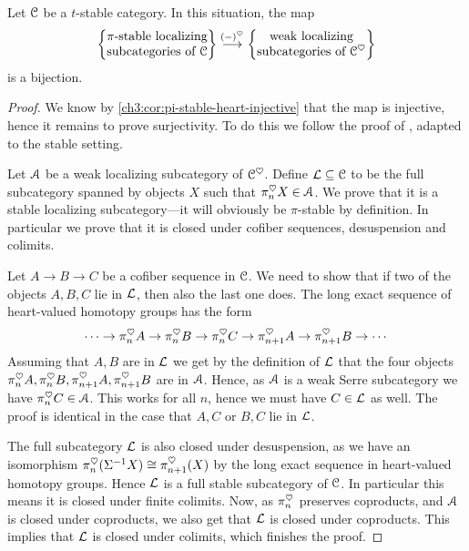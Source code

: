 \begin{theorem}
    \label{ch3:thm:premain}
    Let $\EuScript{C}$ be a $t$-stable category. In this situation, the map 
    \[\left\{ \begin{matrix} \pi\text{-stable localizing}\\ \text{subcategories of }\EuScript{C} \end{matrix} \right\}\overset{(-)^\heartsuit}{\longrightarrow} \left\{ \begin{matrix} \text{weak localizing}\\ \text{subcategories of }\EuScript{C}^\heartsuit \end{matrix} \right\}\] 
    is a bijection. 
\end{theorem}
\begin{proof}
    We know by \cref{ch3:cor:pi-stable-heart-injective} that the map is injective, hence it remains to prove surjectivity. To do this we follow the proof of \cite[C.5.2.7]{lurie_SAG}, adapted to the stable setting. 
    
    Let $\EuScript{A}$ be a weak localizing subcategory of $\EuScript{C}^\heartsuit$. Define $\mathcal{L}\subseteq \EuScript{C}$ to be the full subcategory spanned by objects $X$ such that $\pi_n^\heartsuit X\in \EuScript{A}$. We prove that it is a stable localizing subcategory---it will obviously be $\pi$-stable by definition. In particular we prove that it is closed under cofiber sequences, desuspension and colimits. 

    Let $A\rightarrow B\rightarrow C$ be a cofiber sequence in $\EuScript{C}$. We need to show that if two of the objects $A, B, C$ lie in $\mathcal{L}$, then also the last one does. The long exact sequence of heart-valued homotopy groups has the form 
    \[\cdots\rightarrow \pi^{\heartsuit}_{n}A \rightarrow \pi^{\heartsuit}_{n}B \rightarrow \pi^{\heartsuit}_{n}C \rightarrow \pi^{\heartsuit}_{n+1}A\rightarrow \pi^{\heartsuit}_{n+1}B \rightarrow \cdots \]
    Assuming that $A, B$ are in $\mathcal{L}$ we get by the definition of $\mathcal{L}$ that the four objects $\pi^{\heartsuit}_{n}A, \pi^{\heartsuit}_{n}B, \pi^{\heartsuit}_{n+1}A, \pi^{\heartsuit}_{n+1}B$ are in $\EuScript{A}$. Hence, as $\EuScript{A}$ is a weak Serre subcategory we have $\pi^\heartsuit_n C\in \EuScript{A}$. This works for all $n$, hence we must have $C\in \mathcal{L}$ as well. The proof is identical in the case that $A, C$ or $B, C$ lie in $\mathcal{L}$. 
    
    The full subcategory $\mathcal{L}$ is also closed under desuspension, as we have an isomorphism $\pi_n^\heartsuit (\Sigma^{-1} X)\cong \pi_{n+1}^\heartsuit(X)$ by the long exact sequence in heart-valued homotopy groups. Hence $\mathcal{L}$ is a full stable subcategory of $\EuScript{C}$. In particular this means it is closed under finite colimits. Now, as $\pi_n^\heartsuit$ preserves coproducts, and $\EuScript{A}$ is closed under coproducts, we also get that $\mathcal{L}$ is closed under coproducts. This implies that $\mathcal{L}$ is closed under colimits, which finishes the proof. 
\end{proof}

